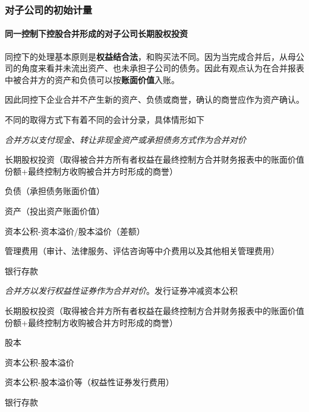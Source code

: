\documentclass[UTF8,12pt]{ctexart}
\newenvironment{Dr}{%
	\begin{list}{}%
		{
			\setlength{\leftmargin}{2em}
			\setlength{\labelwidth}{2em}
			\setlength{\labelsep}{0pt}
			\setlength{\itemindent}{0pt}
			\setlength{\listparindent}{0pt}
			\setlength{\parsep}{0pt}
			\setlength{\topsep}{0pt}
		}
		\item[\textbf{借：}]
	}{%
	\end{list}
}
\newenvironment{Cr}{%
	\begin{list}{}%
		{
			\setlength{\leftmargin}{2em}
			\setlength{\labelwidth}{2em}
			\setlength{\labelsep}{0pt}
			\setlength{\itemindent}{0pt}
			\setlength{\listparindent}{0pt}
			\setlength{\parsep}{0pt}
			\setlength{\topsep}{0pt}
		}
		\item[\textbf{贷：}]
	}{%
	\end{list}
}
\numberwithin{equation}{section} %
\numberwithin{figure}{section}
\numberwithin{table}{section}
\begin{document}
	\subsubsection{对子公司的初始计量}
	\paragraph{同一控制下控股合并形成的对子公司长期股权投资}
	同控下的处理基本原则是\textbf{权益结合法}，和购买法不同。因为当完成合并后，从母公司的角度来看并未流出资产、也未承担子公司的债务。因此有观点认为在合并报表中被合并方的资产和负债可以按\textbf{账面价值}入账。
	
	因此同控下企业合并不产生新的资产、负债或商誉，确认的商誉应作为资产确认。
	
	不同的取得方式下有着不同的会计分录，具体情形如下
	
	\textit{合并方以支付现金、转让非现金资产或承担债务方式作为合并对价}
	
	\begin{Dr}
		长期股权投资（取得被合并方所有者权益在最终控制方合并财务报表中的账面价值份额+最终控制方收购被合并方时形成的商誉）
	\end{Dr}
	\begin{Cr}
		负债（承担债务账面价值）
		
		资产（投出资产账面价值）
		
		资本公积-资本溢价/股本溢价（差额）
	\end{Cr}
	
	\begin{Dr}
		管理费用（审计、法律服务、评估咨询等中介费用以及其他相关管理费用）
	\end{Dr}
	\begin{Cr}
		银行存款
	\end{Cr}
	
	\textit{合并方以发行权益性证券作为合并对价}。发行证券冲减资本公积
	
	\begin{Dr}
		长期股权投资（取得被合并方所有者权益在最终控制方合并财务报表中的账面价值份额+最终控制方收购被合并方时形成的商誉）
	\end{Dr}
	\begin{Cr}
		股本
		
		资本公积-股本溢价
	\end{Cr}
	
	\begin{Dr}
		资本公积-股本溢价等（权益性证券发行费用）
	\end{Dr}
	\begin{Cr}
		银行存款
	\end{Cr}
	
\end{document}
